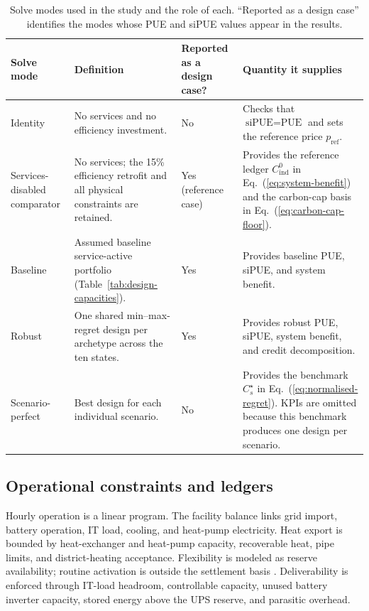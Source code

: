 \documentclass[preprint,12pt]{elsarticle}
\begin{document}
\begin{table}[tbp]
\centering
\scriptsize
\setlength{\tabcolsep}{3pt}
\caption{Solve modes used in the study and the role of each. ``Reported as a
design case'' identifies the modes whose PUE and siPUE values appear in the
results.}
\label{tab:solve-modes}
\begin{tabularx}{\linewidth}{L{2.5cm} L{4.0cm} L{1.9cm} Y}
\toprule
Solve mode & Definition & Reported as a design case? & Quantity it supplies \\
\midrule

Identity
& No services and no efficiency investment.
& No
& Checks that $\text{siPUE}=\text{PUE}$ and sets the reference price
$p_{\text{ref}}$. \\

Services-disabled comparator
& No services; the 15\% efficiency retrofit and all physical constraints are retained.
& Yes (reference case)
& Provides the reference ledger $C_{\text{ind}}^{0}$ in
Eq.~(\ref{eq:system-benefit}) and the carbon-cap basis in
Eq.~(\ref{eq:carbon-cap-floor}). \\

Baseline
& Assumed baseline service-active portfolio
(Table~\ref{tab:design-capacities}).
& Yes
& Provides baseline PUE, siPUE, and system benefit. \\

Robust
& One shared min--max-regret design per archetype across the ten states.
& Yes
& Provides robust PUE, siPUE, system benefit, and credit decomposition. \\

Scenario-perfect
& Best design for each individual scenario.
& No
& Provides the benchmark $C_s^{\star}$ in
Eq.~(\ref{eq:normalised-regret}). KPIs are omitted because this benchmark produces
one design per scenario. \\

\bottomrule
\end{tabularx}
\end{table}


\subsection{Operational constraints and ledgers}

Hourly operation is a linear program. The facility balance links grid import, battery operation, IT load, cooling, and heat-pump electricity. Heat export is bounded by heat-exchanger and heat-pump capacity, recoverable heat, pipe limits, and district-heating acceptance. Flexibility is modeled as reserve availability; routine activation is outside the settlement basis \cite{Takci2025,Crozier2025}. Deliverability is enforced through IT-load headroom, controllable capacity, unused battery inverter capacity, stored energy above the UPS reserve, and parasitic overhead.
\end{document}
